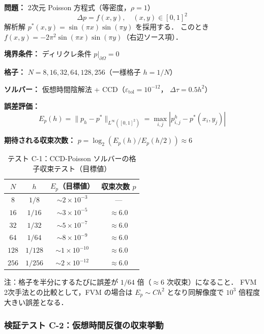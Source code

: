 \begin{tcolorbox}[algbox, title={テスト C-1 の設定}]
\textbf{問題：} 2次元 Poisson 方程式（等密度，$\rho = 1$）
\[
  \Delta p = f(x,y), \quad (x,y) \in [0,1]^2
\]
解析解 $p^*(x,y) = \sin(\pi x)\sin(\pi y)$ を採用する．
このとき $f(x,y) = -2\pi^2\sin(\pi x)\sin(\pi y)$（右辺ソース項）．

\textbf{境界条件：} ディリクレ条件 $p|_{\partial\Omega} = 0$

\textbf{格子：} $N = 8, 16, 32, 64, 128, 256$（一様格子 $h = 1/N$）

\textbf{ソルバー：} 仮想時間陰解法 + CCD（$\varepsilon_{\mathrm{tol}} = 10^{-12}$，
$\Delta\tau = 0.5h^2$）

\textbf{誤差評価：}
\[
  E_p(h) = \|p_h - p^*\|_{L^\infty([0,1]^2)}
  = \max_{i,j}|p_{i,j}^h - p^*(x_i, y_j)|
\]

\textbf{期待される収束次数：} $p = \log_2(E_p(h)/E_p(h/2)) \approx 6$
\end{tcolorbox}

\begin{table}[htbp]
\centering
\caption{テスト C-1：CCD-Poisson ソルバーの格子収束テスト（目標値）}
\label{tab:ccd_poisson_conv}
\begin{tabular}{cccc}
\toprule
$N$ & $h$ & $E_p$（目標値） & 収束次数 $p$ \\
\midrule
$8$   & $1/8$   & $\sim 2 \times 10^{-3}$ & --- \\
$16$  & $1/16$  & $\sim 3 \times 10^{-5}$ & $\approx 6.0$ \\
$32$  & $1/32$  & $\sim 5 \times 10^{-7}$ & $\approx 6.0$ \\
$64$  & $1/64$  & $\sim 8 \times 10^{-9}$ & $\approx 6.0$ \\
$128$ & $1/128$ & $\sim 1 \times 10^{-10}$ & $\approx 6.0$ \\
$256$ & $1/256$ & $\sim 2 \times 10^{-12}$ & $\approx 6.0$ \\
\bottomrule
\end{tabular}

\medskip
注：格子を半分にするたびに誤差が $1/64$ 倍（$\approx 6$ 次収束）になること．
FVM 2次手法との比較として，FVM の場合は $E_p \sim C h^2$ となり同解像度で $10^3$ 倍程度大きい誤差となる．
\end{table}

\subsubsection{検証テスト C-2：仮想時間反復の収束挙動}
\label{sec:ccd_test_c2}

